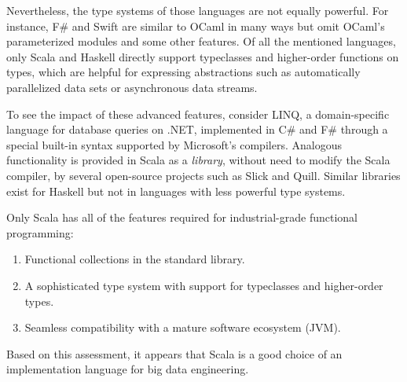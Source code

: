 Nevertheless, the type systems of those languages are not equally
powerful. For instance, F\# and Swift are similar to OCaml in many
ways but omit OCaml\textsf{'}s parameterized modules and some other features.
Of all the mentioned languages, only Scala and Haskell directly support
typeclasses and higher-order functions on types, which are helpful
for expressing abstractions such as automatically parallelized data
sets or asynchronous data streams.

To see the impact of these advanced features, consider LINQ, a domain-specific
language for database queries on .NET, implemented in C\# and F\#
through a special built-in syntax supported by Microsoft\textsf{'}s compilers.
Analogous functionality is provided in Scala as a \emph{library},
without need to modify the Scala compiler, by several open-source
projects such as Slick and Quill. Similar libraries exist for Haskell
\textemdash{} but not in languages with less powerful type systems.


Only Scala has all of the features required for industrial-grade functional
programming:
\begin{enumerate}
\item Functional collections in the standard library.
\item A sophisticated type system with support for typeclasses and higher-order
types.
\item Seamless compatibility with a mature software ecosystem (JVM).
\end{enumerate}
Based on this assessment, it appears that Scala is a good choice of
an implementation language for big data engineering.
